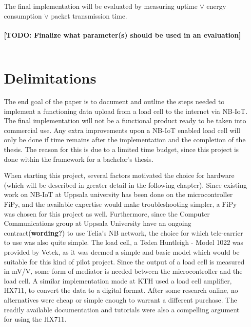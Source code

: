 The final implementation will be evaluated by measuring uptime $\lor$ energy consumption $\lor$ packet transmission time.
\\\\
\textbf{[TODO: Finalize what parameter(s) should be used in an evaluation]}
\\\\	

\section{Delimitations}
\iffalse
\begin{itemize}
	\item Scale down expectations and clarify %
	\item Explain the choice of components %
	\item Explain scope %
\end{itemize}
\fi
The end goal of the paper is to document and outline the steps needed to implement a functioning data upload from a load cell to the internet via NB-IoT. The final implementation will not be a functional product ready to be taken into commercial use. Any extra improvements upon a NB-IoT enabled load cell will only be done if time remains after the implementation and the completion of the thesis. The reason for this is due to a limited time budget, since this project is done within the framework for a bachelor's thesis.

When starting this project, several factors motivated the choice for hardware (which will be described in greater detail in the following chapter). Since existing work on NB-IoT at Uppsala university has been done on the microcontroller FiPy, and the available expertise would make troubleshooting simpler, a FiPy was chosen for this project as well. Furthermore, since the Computer Communications group at Uppsala University have an ongoing contract(\textbf{wording?}) to use Telia's NB network, the choice for which tele-carrier to use was also quite simple. The load cell, a Tedea Huntleigh - Model 1022 was provided by Vetek, as it was deemed a simple and basic model which would be suitable for this kind of pilot project. Since the output of a load cell is measured in mV/V\cite{load-cell-spec}, some form of mediator is needed between the microcontroller and the load cell. A similar implementation made at KTH \cite{hospital} used a load cell amplifier, HX711, to convert the data to a digital format. After some research online, no alternatives were cheap or simple enough to warrant a different purchase. The readily available documentation and tutorials were also a compelling argument for using the HX711. 

